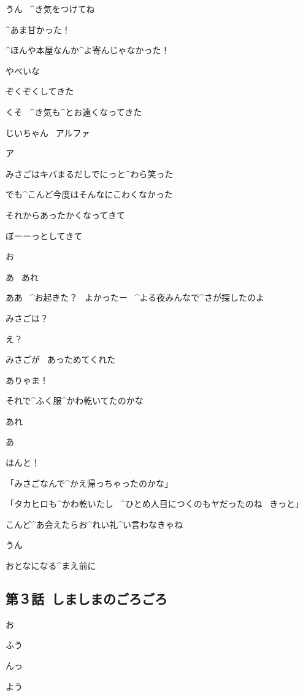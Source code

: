 \Alpha うん
\ ^{き}{気}をつけてね

\page
\Takahiro ^{あま}{甘}かった！

\Takahiro ^{ほんや}{本屋}なんか^{よ}{寄}んじゃなかった！

\page
\Takahiro やべいな

\Takahiro ぞくぞくしてきた

\Takahiro くそ
\ ^{き}{気}も^{とお}{遠}くなってきた

\Takahiro じいちゃん
\ アルファ

\Takahiro ア

\page[59]
\Takahiro みさごはキバまるだしでにっと^{わら}{笑}った

\Takahiro でも^{こんど}{今度}はそんなにこわくなかった

\Takahiro それからあったかくなってきて

\Takahiro ぼーーっとしてきて

\page
\Takahiro お

\Takahiro あ
\ あれ

\Alpha ああ
\ ^{お}{起}きた？
\ よかったー
\ ^{よる}{夜}みんなで^{さが}{探}したのよ

\Takahiro みさごは？

\Alpha え？

\page
\Takahiro みさごが
\ あっためてくれた

\Alpha ありゃま！

\Alpha それで^{ふく}{服}^{かわ}{乾}いてたのかな

\Takahiro あれ

\Alpha あ

\Alpha ほんと！

\page
\Takahiro 「みさごなんで^{かえ}{帰}っちゃったのかな」

\Alpha 「タカヒロも^{かわ}{乾}いたし
\ ^{ひとめ}{人目}につくのもヤだったのね
\ きっと」

\Alpha こんど^{あ}{会}えたらお^{れい}{礼}^{い}{言}わなきゃね

\Takahiro うん

\Takahiro おとなになる^{まえ}{前}に


\subsection{第３話\ しましまのごろごろ}

\page[65]
\Alpha お

\Alpha ふう

\page[67]
\Alpha んっ

\Ojisan よう

